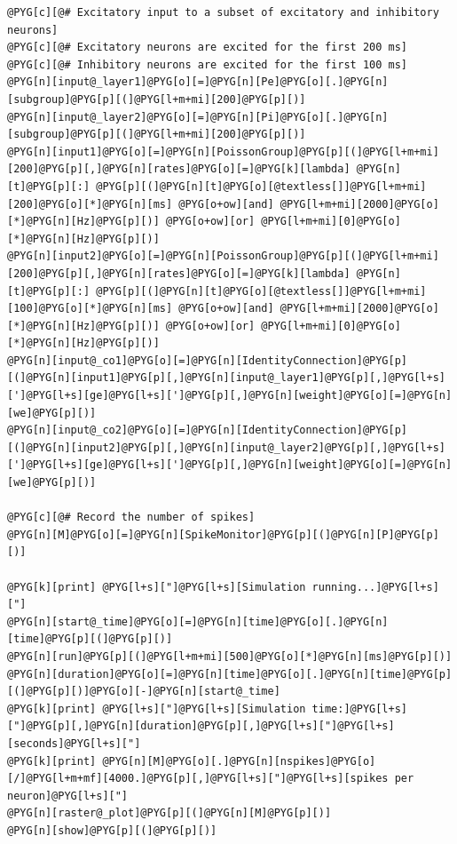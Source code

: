 \documentclass[letterpaper,10pt,english]{manual}
\begin{document}
\begin{Verbatim}[commandchars=@\[\]]
@PYG[c][@# Excitatory input to a subset of excitatory and inhibitory neurons]
@PYG[c][@# Excitatory neurons are excited for the first 200 ms]
@PYG[c][@# Inhibitory neurons are excited for the first 100 ms]
@PYG[n][input@_layer1]@PYG[o][=]@PYG[n][Pe]@PYG[o][.]@PYG[n][subgroup]@PYG[p][(]@PYG[l+m+mi][200]@PYG[p][)]
@PYG[n][input@_layer2]@PYG[o][=]@PYG[n][Pi]@PYG[o][.]@PYG[n][subgroup]@PYG[p][(]@PYG[l+m+mi][200]@PYG[p][)]
@PYG[n][input1]@PYG[o][=]@PYG[n][PoissonGroup]@PYG[p][(]@PYG[l+m+mi][200]@PYG[p][,]@PYG[n][rates]@PYG[o][=]@PYG[k][lambda] @PYG[n][t]@PYG[p][:] @PYG[p][(]@PYG[n][t]@PYG[o][@textless[]]@PYG[l+m+mi][200]@PYG[o][*]@PYG[n][ms] @PYG[o+ow][and] @PYG[l+m+mi][2000]@PYG[o][*]@PYG[n][Hz]@PYG[p][)] @PYG[o+ow][or] @PYG[l+m+mi][0]@PYG[o][*]@PYG[n][Hz]@PYG[p][)]
@PYG[n][input2]@PYG[o][=]@PYG[n][PoissonGroup]@PYG[p][(]@PYG[l+m+mi][200]@PYG[p][,]@PYG[n][rates]@PYG[o][=]@PYG[k][lambda] @PYG[n][t]@PYG[p][:] @PYG[p][(]@PYG[n][t]@PYG[o][@textless[]]@PYG[l+m+mi][100]@PYG[o][*]@PYG[n][ms] @PYG[o+ow][and] @PYG[l+m+mi][2000]@PYG[o][*]@PYG[n][Hz]@PYG[p][)] @PYG[o+ow][or] @PYG[l+m+mi][0]@PYG[o][*]@PYG[n][Hz]@PYG[p][)]
@PYG[n][input@_co1]@PYG[o][=]@PYG[n][IdentityConnection]@PYG[p][(]@PYG[n][input1]@PYG[p][,]@PYG[n][input@_layer1]@PYG[p][,]@PYG[l+s][']@PYG[l+s][ge]@PYG[l+s][']@PYG[p][,]@PYG[n][weight]@PYG[o][=]@PYG[n][we]@PYG[p][)]
@PYG[n][input@_co2]@PYG[o][=]@PYG[n][IdentityConnection]@PYG[p][(]@PYG[n][input2]@PYG[p][,]@PYG[n][input@_layer2]@PYG[p][,]@PYG[l+s][']@PYG[l+s][ge]@PYG[l+s][']@PYG[p][,]@PYG[n][weight]@PYG[o][=]@PYG[n][we]@PYG[p][)]

@PYG[c][@# Record the number of spikes]
@PYG[n][M]@PYG[o][=]@PYG[n][SpikeMonitor]@PYG[p][(]@PYG[n][P]@PYG[p][)]

@PYG[k][print] @PYG[l+s]["]@PYG[l+s][Simulation running...]@PYG[l+s]["]
@PYG[n][start@_time]@PYG[o][=]@PYG[n][time]@PYG[o][.]@PYG[n][time]@PYG[p][(]@PYG[p][)]
@PYG[n][run]@PYG[p][(]@PYG[l+m+mi][500]@PYG[o][*]@PYG[n][ms]@PYG[p][)]
@PYG[n][duration]@PYG[o][=]@PYG[n][time]@PYG[o][.]@PYG[n][time]@PYG[p][(]@PYG[p][)]@PYG[o][-]@PYG[n][start@_time]
@PYG[k][print] @PYG[l+s]["]@PYG[l+s][Simulation time:]@PYG[l+s]["]@PYG[p][,]@PYG[n][duration]@PYG[p][,]@PYG[l+s]["]@PYG[l+s][seconds]@PYG[l+s]["]
@PYG[k][print] @PYG[n][M]@PYG[o][.]@PYG[n][nspikes]@PYG[o][/]@PYG[l+m+mf][4000.]@PYG[p][,]@PYG[l+s]["]@PYG[l+s][spikes per neuron]@PYG[l+s]["]
@PYG[n][raster@_plot]@PYG[p][(]@PYG[n][M]@PYG[p][)]
@PYG[n][show]@PYG[p][(]@PYG[p][)]
\end{Verbatim}

\resetcurrentobjects
\hypertarget{--doc-examples-misc_gap_junctions}{}
\end{document}
